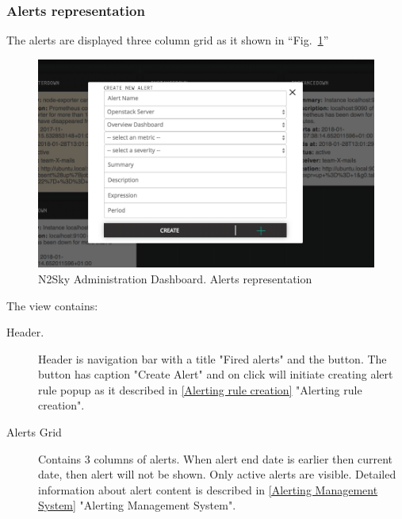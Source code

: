 \subsubsection{Alerts representation}\label{Alerts representation}

The alerts are displayed three column grid as it shown in ``Fig.~\ref{fig:alert_representation}'' 

\begin{figure}[htbp]
\begin{center}
  \includegraphics[width=\linewidth]{components/4/pics/alert_create.png}
  \caption{N2Sky Administration Dashboard. Alerts representation}
  \label{fig:alert_representation}
\end{center}
\end{figure}

The view contains:

\begin{description}
\item[Header.] Header is navigation bar  with a title "Fired alerts" and the button. The button has caption "Create Alert" and on click will initiate creating alert rule popup as it described in \autoref{Alerting rule creation} "Alerting rule creation".
\item[Alerts Grid] Contains 3 columns of alerts. When alert end date is earlier then current date, then alert will not be shown. Only active alerts are visible. Detailed information about  alert content is described in \autoref{Alerting Management System} "Alerting Management System".
\end{description}


